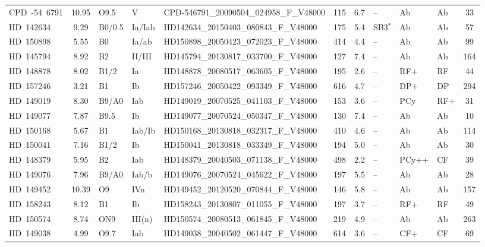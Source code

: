 {\begin{landscape}
\begin{longtable}{lclllcclllc}
\noalign{\smallskip}
CPD~-54~6791 & 10.95 & O9.5 & V & CPD-546791\_20090504\_024958\_F\_V48000 & 115 & 6.7 & -- & Ab & Ab & 33 \\
\noalign{\smallskip}
HD~142634 & 9.29 & B0/0.5 & Ia/Iab & HD142634\_20150403\_080843\_F\_V48000 & 175 & 5.4 & SB3$^{*}$ & Ab & Ab & 57 \\
\noalign{\smallskip}
HD~150898 & 5.55 & B0 & Ia/ab & HD150898\_20050423\_072023\_F\_V48000 & 414 & 4.4 & -- & Ab & Ab & 99 \\
\noalign{\smallskip}
HD~145794 & 8.92 & B2 & II/III & HD145794\_20130817\_033700\_F\_V48000 & 127 & 7.4 & -- & Ab & Ab & 164 \\
\noalign{\smallskip}
HD~148878 & 8.02 & B1/2 & Ia & HD148878\_20080517\_063605\_F\_V48000 & 195 & 2.6 & -- & RF+ & RF & 44 \\
\noalign{\smallskip}
HD~157246 & 3.21 & B1 & Ib & HD157246\_20050422\_093349\_F\_V48000 & 616 & 4.7 & -- & DP+ & DP & 294 \\
\noalign{\smallskip}
HD~149019 & 8.30 & B9/A0 & Iab & HD149019\_20070525\_041103\_F\_V48000 & 153 & 3.6 & -- & PCy & RF+ & 31 \\
\noalign{\smallskip}
HD~149077 & 7.87 & B9.5 & Ib & HD149077\_20070524\_050347\_F\_V48000 & 130 & 7.4 & -- & Ab & Ab & 10 \\
\noalign{\smallskip}
HD~150168 & 5.67 & B1 & Iab/Ib & HD150168\_20130818\_032317\_F\_V48000 & 410 & 4.6 & -- & Ab & Ab & 114 \\
\noalign{\smallskip}
HD~150041 & 7.16 & B1/2 & Ib & HD150041\_20130818\_033349\_F\_V48000 & 194 & 5.0 & -- & Ab & Ab & 30 \\
\noalign{\smallskip}
HD~148379 & 5.95 & B2 & Iab & HD148379\_20040503\_071138\_F\_V48000 & 498 & 2.2 & -- & PCy++ & CF & 39 \\
\noalign{\smallskip}
HD~149076 & 7.96 & B9/A0 & Iab/b & HD149076\_20070524\_045622\_F\_V48000 & 197 & 5.5 & -- & Ab & Ab & 28 \\
\noalign{\smallskip}
HD~149452 & 10.39 & O9 & IVn & HD149452\_20120520\_070844\_F\_V48000 & 146 & 5.8 & -- & Ab & Ab & 157 \\
\noalign{\smallskip}
HD~158243 & 8.12 & B1 & Ib & HD158243\_20130807\_011055\_F\_V48000 & 197 & 3.7 & -- & RF+ & RF & 49 \\
\noalign{\smallskip}
HD~150574 & 8.74 & ON9 & III(n) & HD150574\_20080513\_061845\_F\_V48000 & 219 & 4.9 & -- & Ab & Ab & 263 \\
\noalign{\smallskip}
HD~149038 & 4.99 & O9.7 & Iab & HD149038\_20040502\_061447\_F\_V48000 & 614 & 3.6 & -- & CF+ & CF & 69 \\

\end{longtable}
\end{landscape}}
